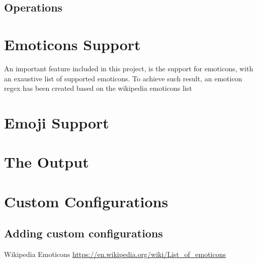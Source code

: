 \documentclass[12pt,a4paper]{report}
\begin{document}
\section{Operations}

\chapter{Emoticons Support}
An important feature included in this project, is the support for emoticons, with an exaustive list of supported emoticons. To achieve such result, an emoticon regex has been created based on the wikipedia emoticons list
\section{}

\chapter{Emoji Support}
\section{}

\chapter{The Output}
\section{}

\chapter{Custom Configurations}
\section{Adding custom configurations}


\newpage
\begin{thebibliography}{}
     Wikipedia Emoticons
    \newline\url{https://en.wikipedia.org/wiki/List_of_emoticons}
\end{thebibliography}
\end{document}

